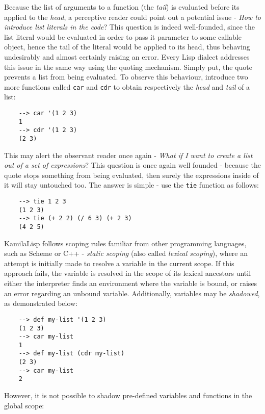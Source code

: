 Because the list of arguments to a function (the \textit{tail}) is evaluated before its applied to the \textit{head}, a perceptive reader could point out a potential issue - \textit{How to introduce list literals in the code}? This question is indeed well-founded, since the list literal would be evaluated in order to pass it parameter to some callable object, hence the tail of the literal would be applied to its head, thus behaving undesirably and almost certainly raising an error. Every Lisp dialect addresses this issue in the same way using the quoting mechanism. Simply put, the quote prevents a list from being evaluated. To observe this behaviour, introduce two more functions called \verb|car| and \verb|cdr| to obtain respectively the \textit{head} and \textit{tail} of a list:

\begin{Verbatim}
    --> car '(1 2 3)
    1
    --> cdr '(1 2 3)
    (2 3)
\end{Verbatim}

This may alert the observant reader once again - \textit{What if I want to create a list out of a set of expressions}? This question is once again well founded - because the quote stops something from being evaluated, then surely the expressions inside of it will stay untouched too. The answer is simple - use the \verb|tie| function as follows:

\begin{Verbatim}
    --> tie 1 2 3
    (1 2 3)
    --> tie (+ 2 2) (/ 6 3) (+ 2 3)
    (4 2 5)
\end{Verbatim}

KamilaLisp follows scoping rules familiar from other programming languages, such as Scheme or C++ - \textit{static scoping} (also called \textit{lexical scoping}), where an attempt is initially made to resolve a variable in the current scope. If this approach fails, the variable is resolved in the scope of its lexical ancestors until either the interpreter finds an environment where the variable is bound, or raises an error regarding an unbound variable. Additionally, variables may be \textit{shadowed}, as demonstrated below:

\begin{Verbatim}
    --> def my-list '(1 2 3)
    (1 2 3)
    --> car my-list
    1
    --> def my-list (cdr my-list)
    (2 3)
    --> car my-list
    2
\end{Verbatim}

However, it is not possible to shadow pre-defined variables and functions in the global scope:

